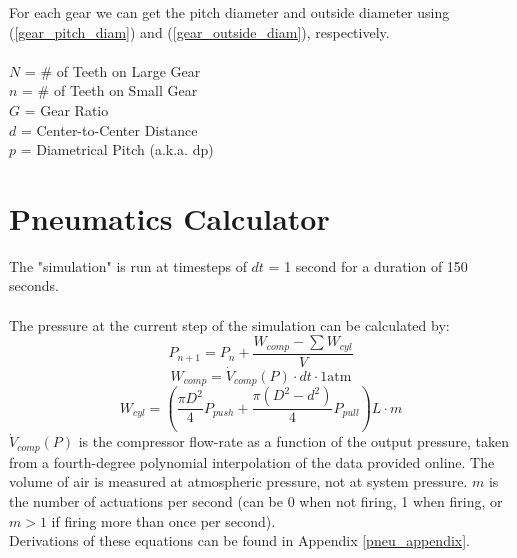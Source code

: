 \documentclass[11pt,a4paper,titlepage]{article}
\begin{document}
	For each gear we can get the pitch diameter and outside diameter using (\ref{gear_pitch_diam}) and (\ref{gear_outside_diam}), respectively. \\ \\
	$N$ = \# of Teeth on Large Gear \\
	$n$ = \# of Teeth on Small Gear \\
	$G$ = Gear Ratio \\
	$d$ = Center-to-Center Distance \\
	$p$ = Diametrical Pitch (a.k.a. dp)\\
	
	\newpage
	\section{Pneumatics Calculator}
	The "simulation" is run at timesteps of $dt$ = 1 second for a duration of 150 seconds. \\ \\
	
	The pressure at the current step of the simulation can be calculated by:
	\begin{equation} \label{pneu_press_timestep}
		P_{n+1} = P_n + \frac{W_{comp} - \sum W_{cyl}}{V}
	\end{equation}
	\begin{equation} \label{pneu_w_comp}
		W_{comp} = \dot{V}_{comp}(P) \cdot dt \cdot 1 \text{atm}
	\end{equation}
	\begin{equation} \label{pneu_w_cyl}
		W_{cyl} = \left( \frac{\pi D^2}{4} P_{push} + \frac{\pi (D^2 - d^2)}{4} P_{pull} \right) L \cdot m
	\end{equation}
	$\dot{V}_{comp}(P)$ is the compressor flow-rate as a function of the output pressure, taken from a fourth-degree polynomial interpolation of the data provided online. The volume of air is measured at atmospheric pressure, not at system pressure. $m$ is the number of actuations per second (can be 0 when not firing, 1 when firing, or $m>1$ if firing more than once per second). \\
	
	Derivations of these equations can be found in Appendix \ref{pneu_appendix}. \\
	
\end{document}
